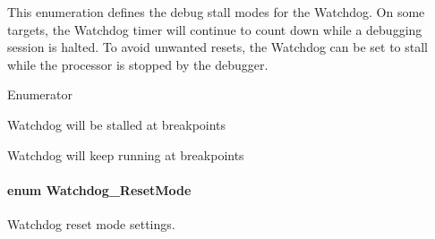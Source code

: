 This enumeration defines the debug stall modes for the Watchdog. On some targets, the Watchdog timer will continue to count down while a debugging session is halted. To avoid unwanted resets, the Watchdog can be set to stall while the processor is stopped by the debugger. \begin{Desc}
\item[Enumerator]\par
\begin{description}
\item[{\em 
Watchdog\-\_\-\-D\-E\-B\-U\-G\-\_\-\-S\-T\-A\-L\-L\-\_\-\-O\-N\label{_watchdog_8h_ab1aa5862661c88a16b9d7bc12709d51ea787c87976091a6f294070dadd1747ed0}
}]Watchdog will be stalled at breakpoints \item[{\em 
Watchdog\-\_\-\-D\-E\-B\-U\-G\-\_\-\-S\-T\-A\-L\-L\-\_\-\-O\-F\-F\label{_watchdog_8h_ab1aa5862661c88a16b9d7bc12709d51ea745be9d89bc0c15eda5c4082020f8bb2}
}]Watchdog will keep running at breakpoints \end{description}
\end{Desc}
\paragraph[{Watchdog\-\_\-\-Reset\-Mode}]{\setlength{\rightskip}{0pt plus 5cm}enum {\bf Watchdog\-\_\-\-Reset\-Mode}}\label{_watchdog_8h_ada0db7216129d7dad494bb0cd0169f88}


Watchdog reset mode settings. 

